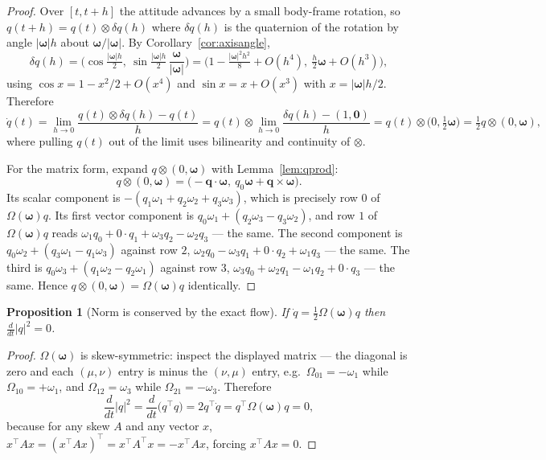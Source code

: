 \documentclass[11pt]{article}
\newcommand{\vv}[1]{\bm{#1}}
\theoremstyle{plain}
\newtheorem{proposition}[theorem]{Proposition}
\theoremstyle{definition}
\begin{document}
\begin{proof}
Over $[t,t+h]$ the attitude advances by a small body-frame rotation, so
$q(t+h)=q(t)\otimes\delta q(h)$ where $\delta q(h)$ is the quaternion of the rotation by angle
$|\bm\omega|h$ about $\bm\omega/|\bm\omega|$. By Corollary~\ref{cor:axisangle},
\[
\delta q(h)=\Big(\cos\tfrac{|\bm\omega|h}{2},\ \sin\tfrac{|\bm\omega|h}{2}\,
\frac{\bm\omega}{|\bm\omega|}\Big)
=\Big(1-\tfrac{|\bm\omega|^2h^2}{8}+O(h^4),\ \tfrac{h}{2}\bm\omega+O(h^3)\Big),
\]
using $\cos x=1-x^2/2+O(x^4)$ and $\sin x=x+O(x^3)$ with $x=|\bm\omega|h/2$. Therefore
\[
\dot q(t)=\lim_{h\to0}\frac{q(t)\otimes\delta q(h)-q(t)}{h}
=q(t)\otimes\lim_{h\to0}\frac{\delta q(h)-(1,\vv 0)}{h}
=q(t)\otimes\big(0,\tfrac12\bm\omega\big)=\tfrac12 q\otimes(0,\bm\omega),
\]
where pulling $q(t)$ out of the limit uses bilinearity and continuity of $\otimes$.

For the matrix form, expand $q\otimes(0,\bm\omega)$ with Lemma~\ref{lem:qprod}:
\[
q\otimes(0,\bm\omega)=\big(-\vv q\cdot\bm\omega,\ q_0\bm\omega+\vv q\times\bm\omega\big).
\]
Its scalar component is $-(q_1\omega_1+q_2\omega_2+q_3\omega_3)$, which is precisely row $0$ of
$\Omega(\bm\omega)q$. Its first vector component is
$q_0\omega_1+(q_2\omega_3-q_3\omega_2)$, and row $1$ of $\Omega(\bm\omega)q$ reads
$\omega_1q_0+0\cdot q_1+\omega_3q_2-\omega_2q_3$ --- the same. The second component is
$q_0\omega_2+(q_3\omega_1-q_1\omega_3)$ against row $2$,
$\omega_2q_0-\omega_3q_1+0\cdot q_2+\omega_1q_3$ --- the same. The third is
$q_0\omega_3+(q_1\omega_2-q_2\omega_1)$ against row $3$,
$\omega_3q_0+\omega_2q_1-\omega_1q_2+0\cdot q_3$ --- the same. Hence
$q\otimes(0,\bm\omega)=\Omega(\bm\omega)q$ identically.
\end{proof}

\begin{proposition}[Norm is conserved by the exact flow]\label{prop:normcons}
If $\dot q=\tfrac12\Omega(\bm\omega)q$ then $\frac{d}{dt}|q|^2=0$.
\end{proposition}

\begin{proof}
$\Omega(\bm\omega)$ is skew-symmetric: inspect the displayed matrix --- the diagonal is zero and
each $(\mu,\nu)$ entry is minus the $(\nu,\mu)$ entry, e.g.\ $\Omega_{01}=-\omega_1$ while
$\Omega_{10}=+\omega_1$, and $\Omega_{12}=\omega_3$ while $\Omega_{21}=-\omega_3$. Therefore
\[
\frac{d}{dt}|q|^2=\frac{d}{dt}\big(q^{\!\top}q\big)=2q^{\!\top}\dot q
=q^{\!\top}\Omega(\bm\omega)q=0 ,
\]
because for any skew $A$ and any vector $x$, $x^{\!\top}Ax=(x^{\!\top}Ax)^{\!\top}
=x^{\!\top}A^{\!\top}x=-x^{\!\top}Ax$, forcing $x^{\!\top}Ax=0$.
\end{proof}
\end{document}
